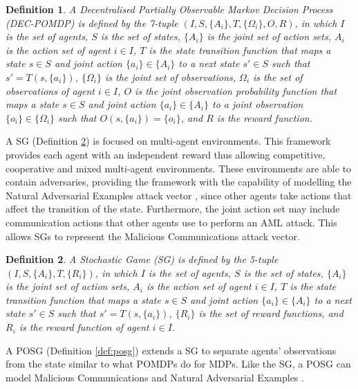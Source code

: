 \documentclass[conference,compsoc]{IEEEtran}
\newtheorem{definition}{Definition}
\begin{document}
\begin{definition}
A Decentralised Partially Observable Markov Decision Process (DEC-POMDP) is defined by the 7-tuple $(I, S, \{A_i\}, T, \{\Omega_i\}, O, R)$, in which $I$ is the set of agents, $S$ is the set of states, $\{A_i\}$ is the joint set of action sets, $A_i$ is the action set of agent $i \in I$, $T$ is the state transition function that maps a state $s \in S$ and joint action $\{a_i\} \in \{A_i\}$ to a next state $s' \in S$ such that $s' = T(s, \{a_i\})$, $\{\Omega_i\}$ is the joint set of observations, $\Omega_i$ is the set of observations of agent $i \in I$, $O$ is the joint observation probability function that maps a state $s \in S$ and joint action $\{a_i\} \in \{A_i\}$ to a joint observation $\{o_i\} \in \{\Omega_i\}$ such that $O(s, \{a_i\}) = \{o_i\}$, and $R$ is the reward function.
\label{def:dec_pomdp}
\end{definition}

A SG \cite{shapley_stochastic_1953} (Definition \ref{def:sg}) is focused on multi-agent environments. This framework provides each agent with an independent reward thus allowing competitive, cooperative and mixed multi-agent environments. These environments are able to contain adversaries, providing the framework with the capability of modelling the Natural Adversarial Examples attack vector \cite{pinto_robust_2017,guo_adversarial_2021,gleave_adversarial_2020}, since other agents take actions that affect the transition of the state. Furthermore, the joint action set may include communication actions that other agents  use to perform an AML attack. This allows SGs to represent the Malicious Communications attack vector.

\begin{definition}
A Stochastic Game (SG) is defined by the 5-tuple $(I, S, \{A_i\}, T, \{R_i\})$, in which $I$ is the set of agents, $S$ is the set of states, $\{A_i\}$ is the joint set of action sets, $A_i$ is the action set of agent $i \in I$, $T$ is the state transition function that maps a state $s \in S$ and joint action $\{a_i\} \in \{A_i\}$ to a next state $s' \in S$ such that $s' = T(s, \{a_i\})$, $\{R_i\}$ is the set of reward functions, and $R_i$ is the reward function of agent $i \in I$.
\label{def:sg}
\end{definition}

A POSG  \cite{hansen_dynamic_2004} (Definition \ref{def:posg}) extends a SG to separate agents' observations from the state similar to what POMDPs do for MDPs. Like the SG, a POSG can model Malicious Communications and Natural Adversarial Examples \cite{phan_learning_2020}.
\end{document}

